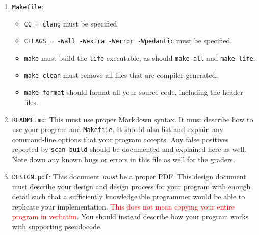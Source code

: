 \begin{enumerate}
  \item \texttt{Makefile}:
    \begin{itemize}
      \item \texttt{CC = clang} must be specified.
      \item \texttt{CFLAGS = -Wall -Wextra -Werror -Wpedantic} must be specified.
      \item \texttt{make} must build the \texttt{life} executable, as should
        \texttt{make all} and \texttt{make life}.
      \item \texttt{make clean} must remove all files that are compiler
        generated.
      \item \texttt{make format} should format all your source code,
        including the header files.
    \end{itemize}
  \item \texttt{README.md}: This must use proper Markdown syntax. It
    must describe how to use your program and \texttt{Makefile}. It
    should also list and explain any command-line options that your
    program accepts. Any false positives reported by \texttt{scan-build}
    should be documented and explained here as well. Note down any known
    bugs or errors in this file as well for the graders.
  \item \texttt{DESIGN.pdf}: This document \emph{must} be a proper
    PDF\@. This design document must describe your design and design
    process for your program with enough detail such that a sufficiently
    knowledgeable programmer would be able to replicate your
    implementation. \textcolor{red}{This does not mean copying your
    entire program in verbatim}. You should instead describe how your
    program works with supporting pseudocode.
\end{enumerate}
